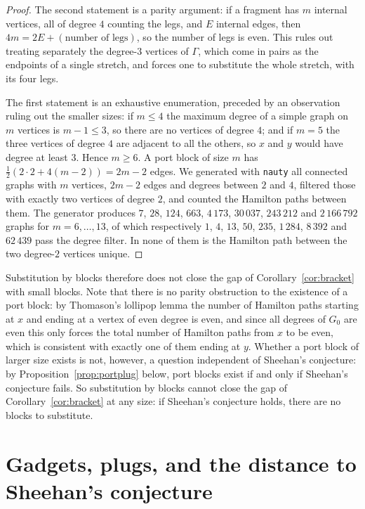\documentclass[11pt,a4paper]{article}
\theoremstyle{definition}
\theoremstyle{remark}
\begin{document}
\begin{proof}
The second statement is a parity argument: if a fragment has $m$ internal vertices, all of degree $4$ counting the legs, and $E$ internal edges, then $4m=2E+(\text{number of legs})$, so the number of legs is even. This rules out treating separately the degree-$3$ vertices of $\Gamma$, which come in pairs as the endpoints of a single stretch, and forces one to substitute the whole stretch, with its four legs.

The first statement is an exhaustive enumeration, preceded by an observation ruling out the smaller sizes: if $m\le4$ the maximum degree of a simple graph on $m$ vertices is $m-1\le3$, so there are no vertices of degree $4$; and if $m=5$ the three vertices of degree $4$ are adjacent to all the others, so $x$ and $y$ would have degree at least $3$. Hence $m\ge6$. A port block of size $m$ has $\tfrac12(2\cdot2+4(m-2))=2m-2$ edges. We generated with \texttt{nauty} all connected graphs with $m$ vertices, $2m-2$ edges and degrees between $2$ and $4$, filtered those with exactly two vertices of degree $2$, and counted the Hamilton paths between them. The generator produces $7$, $28$, $124$, $663$, $4\,173$, $30\,037$, $243\,212$ and $2\,166\,792$ graphs for $m=6,\dots,13$, of which respectively $1$, $4$, $13$, $50$, $235$, $1\,284$, $8\,392$ and $62\,439$ pass the degree filter. In none of them is the Hamilton path between the two degree-$2$ vertices unique.
\end{proof}

Substitution by blocks therefore does not close the gap of Corollary~\ref{cor:bracket} with small blocks. Note that there is no parity obstruction to the existence of a port block: by Thomason's lollipop lemma \cite{thomason78} the number of Hamilton paths starting at $x$ and ending at a vertex of even degree is even, and since all degrees of $G_0$ are even this only forces the total number of Hamilton paths from $x$ to be even, which is consistent with exactly one of them ending at $y$. Whether a port block of larger size exists is not, however, a question independent of Sheehan's conjecture: by Proposition~\ref{prop:portplug} below, port blocks exist if and only if Sheehan's conjecture fails. So substitution by blocks cannot close the gap of Corollary~\ref{cor:bracket} at any size: if Sheehan's conjecture holds, there are no blocks to substitute.

\section{Gadgets, plugs, and the distance to Sheehan's conjecture}\label{sec:gadgets}
\end{document}
